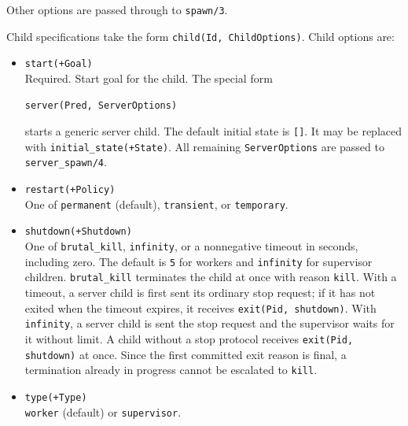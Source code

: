 \noindent Other options are passed through to \texttt{spawn/\allowbreak{}3}.

\medskip
\noindent Child specifications take the form \texttt{child(\allowbreak{}Id,\allowbreak{} ChildOptions)}.
Child options are:

\begin{itemize}
\item
  \texttt{start(\allowbreak{}+Goal)}\\
  Required. Start goal for the child. The special form
\begin{verbatim}
server(Pred, ServerOptions)
\end{verbatim}
  starts a generic server child.
  The default initial state is \texttt{[]}. It may be replaced with
  \texttt{initial\_\allowbreak{}state(\allowbreak{}+State)}. All remaining \texttt{ServerOptions} are passed to
  \texttt{server\_\allowbreak{}spawn/\allowbreak{}4}.
\item
  \texttt{restart(\allowbreak{}+Policy)}\\
  One of \texttt{permanent} (default), \texttt{transient}, or
  \texttt{temporary}.
\item
  \texttt{shutdown(\allowbreak{}+Shutdown)}\\
    One of \texttt{brutal\_\allowbreak{}kill}, \texttt{infinity}, or a nonnegative timeout in seconds, including zero. The default is \texttt{5} for workers and \texttt{infinity} for supervisor children. \texttt{brutal\_\allowbreak{}kill} terminates the child at once with reason \texttt{kill}. With a timeout, a server child is first sent its ordinary stop request; if it has not exited when the timeout expires, it receives \texttt{exit(\allowbreak{}Pid,\allowbreak{}\,\allowbreak{}shutdown)}. With \texttt{infinity}, a server child is sent the stop request and the supervisor waits for it without limit. A child without a stop protocol receives \texttt{exit(\allowbreak{}Pid,\allowbreak{}\,\allowbreak{}shutdown)} at once. Since the first committed exit reason is final, a termination already in progress cannot be escalated to \texttt{kill}.
\item
  \texttt{type(\allowbreak{}+Type)}\\
  \texttt{worker} (default) or \texttt{supervisor}.
\end{itemize}

